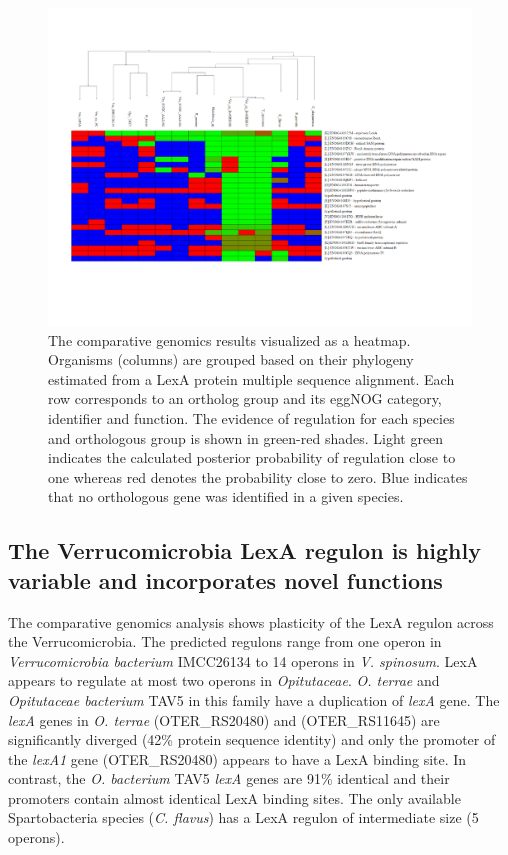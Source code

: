 \begin{figure}
  \centering
  \includegraphics[width=\textwidth]{figures/chapter5/cgb}
  \caption{The comparative genomics results visualized as a heatmap. Organisms
    (columns) are grouped based on their phylogeny estimated from a LexA
    protein multiple sequence alignment. Each row corresponds to an ortholog
    group and its eggNOG category, identifier and function. The evidence of
    regulation for each species and orthologous group is shown in green-red
    shades. Light green indicates the calculated posterior probability of
    regulation close to one whereas red denotes the probability close to
    zero. Blue indicates that no orthologous gene was identified in a given
    species.}
  \label{fig:cgb}
\end{figure}

\subsection{The Verrucomicrobia LexA regulon is highly variable and
  incorporates novel functions}

The comparative genomics analysis shows plasticity of the LexA regulon across
the Verrucomicrobia. The predicted regulons range from one operon in
\textit{Verrucomicrobia bacterium} IMCC26134 to 14 operons in
\textit{V. spinosum}. LexA appears to regulate at most two operons in
\textit{Opitutaceae}. \textit{O. terrae} and \textit{Opitutaceae bacterium}
TAV5 in this family have a duplication of \textit{lexA} gene. The \textit{lexA}
genes in \textit{O. terrae} (OTER\_RS20480) and (OTER\_RS11645) are
significantly diverged (42\% protein sequence identity) and only the promoter
of the \textit{lexA1} gene (OTER\_RS20480) appears to have a LexA binding
site. In contrast, the \textit{O. bacterium} TAV5 \textit{lexA} genes are 91\%
identical and their promoters contain almost identical LexA binding sites. The
only available Spartobacteria species (\textit{C. flavus}) has a LexA regulon
of intermediate size (5 operons).

